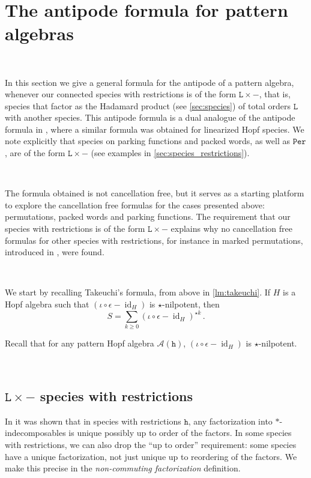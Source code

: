 \documentclass[12pt, reqno]{amsart}
\theoremstyle{definition}
\DeclareMathOperator{\id}{id}
\begin{document}
\
\section{The antipode formula for pattern algebras \label{sec:formula_general}}
\

In this section we give a general formula for the antipode of a pattern algebra, whenever our connected species with restrictions is of the form $\mathtt{L} \times -$, that is, species that factor as the Hadamard product (see \cref{sec:species}) of total orders $\mathtt{L}$ with another species.
This antipode formula is a dual analogue of the antipode formula in \cite{BergeronBenedetti}, where a similar formula was obtained for linearized Hopf species.
We note explicitly that species on parking functions and packed words, as well as $\mathtt{Per}$, are of the form $\mathtt{L} \times -$ (see examples in \cref{sec:species_restrictions}).

\

The formula obtained is not cancellation free, but it serves as a starting platform to explore the cancellation free formulas for the cases presented above: permutations, packed words and parking functions. The requirement that our species with restrictions is of the form $\mathtt{L} \times -$ explains why no cancellation free formulas for other species with restrictions, for instance in marked permutations, introduced in \cite{Penaguiao2020}, were found.

\

We start by recalling Takeuchi's formula, from above in \cref{lm:takeuchi}.
If $H$ is a Hopf algebra such that $(  \iota  \circ\epsilon - \id_H)$ is $\star$-nilpotent, then 
$$S = \sum_{k\geq 0 }  ( \iota  \circ\epsilon- \id_H)^{\star k}\, . $$

Recall that for any pattern Hopf algebra $\mathcal A (\mathtt{h})$, $(\iota\circ \epsilon - \id_H)$ is $\star$-nilpotent. 

\

\subsection{$\mathtt{L}\times -$ species with restrictions}


In \cite[Corollary 4.4.]{Penaguiao2020} it was shown that in species with restrictions $\mathtt{h}$, any factorization into $\ast$-indecomposables is unique possibly up to order of the factors.
In some species with restrictions, we can also drop the ``up to order'' requirement: some species have a unique factorization, not just unique up to reordering of the factors. We make this precise in the \textit{non-commuting factorization} definition.
\end{document}
